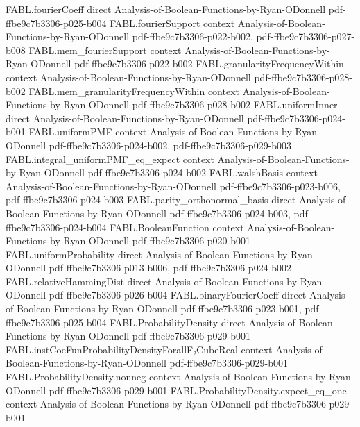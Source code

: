 \begin{theorem}
\proofstep
  {FABL.fourierCoeff}
  {direct}
  {Analysis-of-Boolean-Functions-by-Ryan-ODonnell}
  {pdf-ffbe9c7b3306-p025-b004}
\proofstep
  {FABL.fourierSupport}
  {context}
  {Analysis-of-Boolean-Functions-by-Ryan-ODonnell}
  {pdf-ffbe9c7b3306-p022-b002,
    pdf-ffbe9c7b3306-p027-b008}
\proofstep
  {FABL.mem_fourierSupport}
  {context}
  {Analysis-of-Boolean-Functions-by-Ryan-ODonnell}
  {pdf-ffbe9c7b3306-p022-b002}
\proofstep
  {FABL.granularityFrequencyWithin}
  {context}
  {Analysis-of-Boolean-Functions-by-Ryan-ODonnell}
  {pdf-ffbe9c7b3306-p028-b002}
\proofstep
  {FABL.mem_granularityFrequencyWithin}
  {context}
  {Analysis-of-Boolean-Functions-by-Ryan-ODonnell}
  {pdf-ffbe9c7b3306-p028-b002}
\proofstep
  {FABL.uniformInner}
  {direct}
  {Analysis-of-Boolean-Functions-by-Ryan-ODonnell}
  {pdf-ffbe9c7b3306-p024-b001}
\proofstep
  {FABL.uniformPMF}
  {context}
  {Analysis-of-Boolean-Functions-by-Ryan-ODonnell}
  {pdf-ffbe9c7b3306-p024-b002,
    pdf-ffbe9c7b3306-p029-b003}
\proofstep
  {FABL.integral_uniformPMF_eq_expect}
  {context}
  {Analysis-of-Boolean-Functions-by-Ryan-ODonnell}
  {pdf-ffbe9c7b3306-p024-b002}
\proofstep
  {FABL.walshBasis}
  {context}
  {Analysis-of-Boolean-Functions-by-Ryan-ODonnell}
  {pdf-ffbe9c7b3306-p023-b006,
    pdf-ffbe9c7b3306-p024-b003}
\proofstep
  {FABL.parity_orthonormal_basis}
  {direct}
  {Analysis-of-Boolean-Functions-by-Ryan-ODonnell}
  {pdf-ffbe9c7b3306-p024-b003,
    pdf-ffbe9c7b3306-p024-b004}
\proofstep
  {FABL.BooleanFunction}
  {context}
  {Analysis-of-Boolean-Functions-by-Ryan-ODonnell}
  {pdf-ffbe9c7b3306-p020-b001}
\proofstep
  {FABL.uniformProbability}
  {direct}
  {Analysis-of-Boolean-Functions-by-Ryan-ODonnell}
  {pdf-ffbe9c7b3306-p013-b006,
    pdf-ffbe9c7b3306-p024-b002}
\proofstep
  {FABL.relativeHammingDist}
  {direct}
  {Analysis-of-Boolean-Functions-by-Ryan-ODonnell}
  {pdf-ffbe9c7b3306-p026-b004}
\proofstep
  {FABL.binaryFourierCoeff}
  {direct}
  {Analysis-of-Boolean-Functions-by-Ryan-ODonnell}
  {pdf-ffbe9c7b3306-p023-b001,
    pdf-ffbe9c7b3306-p025-b004}
\proofstep
  {FABL.ProbabilityDensity}
  {direct}
  {Analysis-of-Boolean-Functions-by-Ryan-ODonnell}
  {pdf-ffbe9c7b3306-p029-b001}
\proofstep
  {FABL.instCoeFunProbabilityDensityForallF₂CubeReal}
  {context}
  {Analysis-of-Boolean-Functions-by-Ryan-ODonnell}
  {pdf-ffbe9c7b3306-p029-b001}
\proofstep
  {FABL.ProbabilityDensity.nonneg}
  {context}
  {Analysis-of-Boolean-Functions-by-Ryan-ODonnell}
  {pdf-ffbe9c7b3306-p029-b001}
\proofstep
  {FABL.ProbabilityDensity.expect_eq_one}
  {context}
  {Analysis-of-Boolean-Functions-by-Ryan-ODonnell}
  {pdf-ffbe9c7b3306-p029-b001}

\end{theorem}
